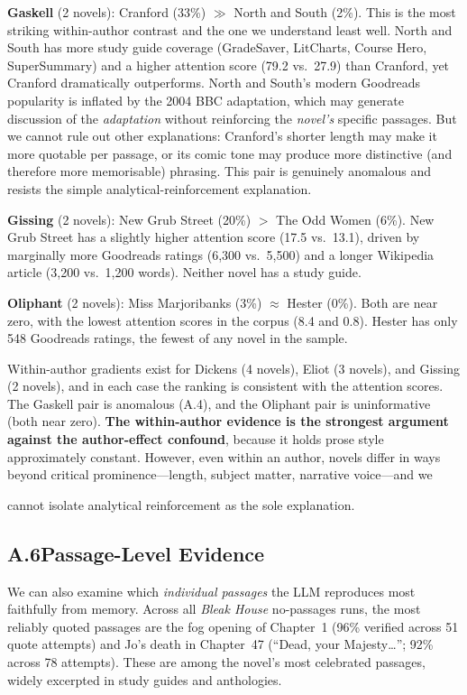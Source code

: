 \textbf{Gaskell} (2 novels): Cranford (33\%) $\gg$ North and South
(2\%).  This is the most striking within-author contrast and the one
we understand least well.  North and South has more study guide
coverage (GradeSaver, LitCharts, Course Hero, SuperSummary) and a
higher attention score (79.2 vs.\ 27.9) than Cranford, yet Cranford
dramatically outperforms.  North and South's modern Goodreads
popularity is inflated by the 2004 BBC adaptation, which may generate
discussion of the \emph{adaptation} without reinforcing the
\emph{novel's} specific passages.  But we cannot rule out other
explanations: Cranford's shorter length may make it more quotable per
passage, or its comic tone may produce more distinctive (and therefore
more memorisable) phrasing.  This pair is genuinely anomalous and
resists the simple analytical-reinforcement explanation.

\textbf{Gissing} (2 novels): New Grub Street (20\%) $>$ The Odd Women
(6\%).  New Grub Street has a slightly higher attention score (17.5
vs.\ 13.1), driven by marginally more Goodreads ratings (6,300
vs.\ 5,500) and a longer Wikipedia article (3,200 vs.\ 1,200 words).
Neither novel has a study guide.

\textbf{Oliphant} (2 novels): Miss Marjoribanks (3\%) $\approx$
Hester (0\%).  Both are near zero, with the lowest attention scores
in the corpus (8.4 and 0.8).  Hester has only 548 Goodreads ratings,
the fewest of any novel in the sample.

\medskip\noindent
Within-author gradients exist for Dickens (4 novels), Eliot (3 novels),
and Gissing (2 novels), and in each case the ranking is consistent with
the attention scores.  The Gaskell pair is anomalous (A.4), and the
Oliphant pair is uninformative (both near zero).  \textbf{The
within-author evidence is the strongest argument against the
author-effect confound}, because it holds prose style approximately
constant.  However, even within an author, novels differ in ways beyond
critical prominence---length, subject matter, narrative voice---and we

cannot isolate analytical reinforcement as the sole explanation.

\subsection*{A.6\quad Passage-Level Evidence}

We can also examine which \emph{individual passages} the LLM
reproduces most faithfully from memory.  Across all \emph{Bleak House}
no-passages runs, the most reliably quoted passages are the fog
opening of Chapter~1 (96\% verified across 51 quote attempts) and
Jo's death in Chapter~47 (``Dead, your Majesty\ldots''; 92\% across
78 attempts).  These are among the novel's most celebrated passages,
widely excerpted in study guides and anthologies.

